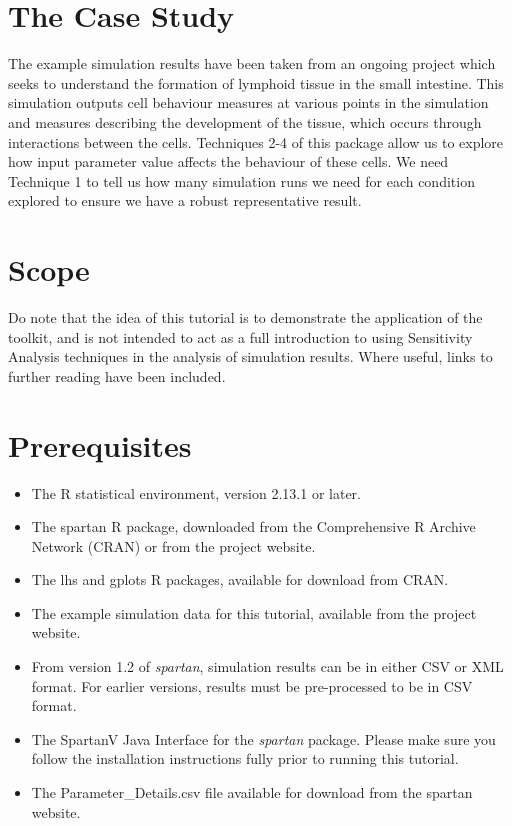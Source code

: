 \documentclass[a4paper,11pt]{article}
\begin{document}
\section{The Case Study}
\noindent The example simulation results have been taken from an ongoing project which seeks to understand the formation of lymphoid tissue in the small intestine. This simulation outputs cell behaviour measures at various points in the simulation and measures describing the development of the tissue, which occurs through interactions between the cells. Techniques 2-4 of this package allow us to explore how input parameter value affects the behaviour of these cells. We need Technique 1 to tell us how many simulation runs we need for each condition explored to ensure we have a robust representative result.

\section{Scope}
\noindent Do note that the idea of this tutorial is to demonstrate the application of the toolkit, and is not intended to act as a full introduction to using Sensitivity Analysis techniques in the analysis of simulation results. Where useful, links to further reading have been included.

\section{Prerequisites}
\begin{itemize}
\item The R statistical environment, version 2.13.1 or later.
\item The spartan R package, downloaded from the Comprehensive R Archive Network (CRAN) or from the project website.
\item The lhs and gplots R packages, available for download from CRAN.
\item The example simulation data for this tutorial, available from the project website.
\item From version 1.2 of \textit{spartan}, simulation results can be in either CSV or XML format. For earlier versions, results must be pre-processed to be in CSV format.
\item The SpartanV Java Interface for the \textit{spartan} package. Please make sure you follow the installation instructions fully prior to running this tutorial.
\item The Parameter\_Details.csv file available for download from the spartan website.
\end{itemize}
\end{document}
